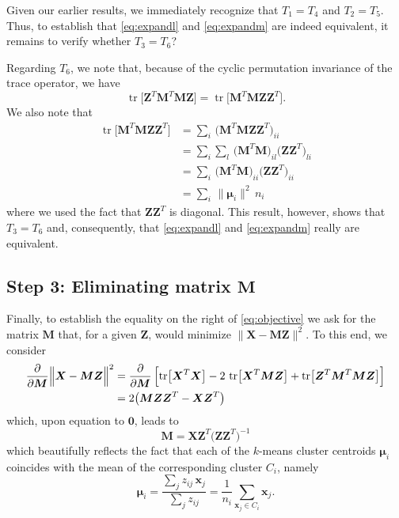 \documentclass[fleqn]{llncs}
\newcommand{\mat}[1]{\boldsymbol{{#1}}}
\renewcommand{\vec}[1]{\boldsymbol{{#1}}}
\newcommand{\nrm}[1]{\bigl \lVert #1 \bigr \rVert^2}
\newcommand{\dsq}[2]{\bigl \lVert #1 - #2 \bigr \rVert^2}
\newcommand{\DSQ}[2]{\Bigl \lVert #1 - #2 \Bigr \rVert^2}
\newcommand{\tr}[1]{\operatorname{tr} \bigl [ #1 \bigr ]}
\begin{document}
Given our earlier results, we immediately recognize that $T_1 = T_4$ and $T_2 = T_5$. Thus, to establish that \eqref{eq:expandl} and \eqref{eq:expandm} are indeed equivalent, it remains to verify whether $T_3 = T_6$?

Regarding $T_6$, we note that, because of the cyclic permutation invariance of the trace operator, we have
\begin{equation}
\tr{\mat{Z}^T \mat{M}^T \mat{M} \mat{Z}} = \tr{\mat{M}^T \mat{M} \mat{Z} \mat{Z}^T}.
\end{equation}
We also note that
\begin{align}
\tr{\mat{M}^T \mat{M} \mat{Z} \mat{Z}^T}
& = \sum_i \, \bigl( \mat{M}^T \mat{M} \mat{Z} \mat{Z}^T \bigr)_{ii} \\
& = \sum_i \sum_l \, \bigl( \mat{M}^T \mat{M} \bigr)_{il} \bigl( \mat{Z} \mat{Z}^T \bigr)_{li} \\
& = \sum_i \, \bigl( \mat{M}^T \mat{M} \bigr)_{ii} \bigl( \mat{Z} \mat{Z}^T \bigr)_{ii} \\
& = \sum_i \, \nrm{\vec{\mu}_i} \, n_i
\end{align}
where we used the fact that $\mat{Z} \mat{Z}^T$ is diagonal. This result, however, shows that $T_3 = T_6$ and, consequently, that \eqref{eq:expandl} and \eqref{eq:expandm} really are equivalent.



\subsection{Step 3: Eliminating matrix $\mat{M}$}

Finally, to establish the equality on the right of \eqref{eq:objective} we ask for the matrix $\mat{M}$ that, for a given $\mat{Z}$, would minimize $\dsq{\mat{X}}{\mat{M} \mat{Z}}$. To this end, we consider
\begin{align}
\frac{\partial}{ \partial \mat{M}} \DSQ{\mat{X}}{\mat{M} \mat{Z}}
& = \frac{\partial}{ \partial \mat{M}} \left[ \tr{\mat{X}^T \mat{X}} - 2 \, \tr{\mat{X}^T \mat{M} \mat{Z}} + \tr{\mat{Z}^T \mat{M}^T \mat{M} \mat{Z}} \right] \notag \\
& = 2 \bigl( \mat{M} \mat{Z} \mat{Z}^T - \mat{X} \mat{Z}^T \bigr)
\end{align}
which, upon equation to $\mat{0}$, leads to
\begin{equation}
\mat{M} = \mat{X} \mat{Z}^T \bigl( \mat{Z} \mat{Z}^T \bigr)^{-1}
\end{equation}
which beautifully reflects the fact that each of the $k$-means cluster centroids $\vec{\mu}_i$ coincides with the mean of the corresponding cluster $C_i$, namely
\begin{equation}
\vec{\mu}_i = \frac{\sum_j z_{ij} \, \vec{x}_j}{\sum_j z_{ij}} = \frac{1}{n_i} \sum_{\vec{x}_j \in C_i} \vec{x}_j.
\end{equation}
\end{document}
